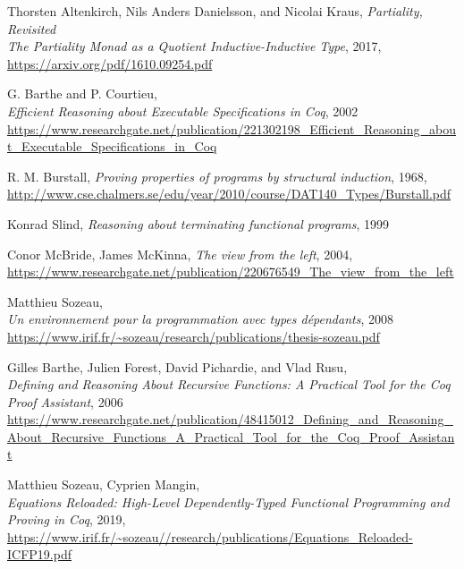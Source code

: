 \documentclass[declaration,mgr,english,shortabstract]{iithesis}
\begin{document}
\begin{thebibliography}{1}
    Thorsten Altenkirch, Nils Anders Danielsson, and Nicolai Kraus,
    \textit{Partiality, Revisited \\The Partiality Monad as a Quotient Inductive-Inductive Type},
    2017, \\
    \url{https://arxiv.org/pdf/1610.09254.pdf}

    G. Barthe and P. Courtieu, \\
    \textit{Efficient Reasoning about Executable Specifications in Coq},
    2002 \\
    \url{https://www.researchgate.net/publication/221302198_Efficient_Reasoning_about_Executable_Specifications_in_Coq}

    R. M. Burstall,
    \textit{Proving properties of programs by structural induction},
    1968, \\
    \url{http://www.cse.chalmers.se/edu/year/2010/course/DAT140_Types/Burstall.pdf}

    Konrad Slind,
    \textit{Reasoning about terminating functional programs},
    1999

    Conor McBride, James McKinna,
    \textit{The view from the left},
    2004, \\
    \url{https://www.researchgate.net/publication/220676549_The_view_from_the_left}

    Matthieu Sozeau, \\
    \textit{Un environnement pour la programmation avec types d\'{e}pendants},
    2008 \\
    \url{https://www.irif.fr/~sozeau/research/publications/thesis-sozeau.pdf}

    Gilles Barthe, Julien Forest, David Pichardie, and Vlad Rusu, \\
    \textit{Defining and Reasoning About Recursive Functions: A Practical Tool for the Coq Proof Assistant},
    2006 \\
    \url{https://www.researchgate.net/publication/48415012_Defining_and_Reasoning_About_Recursive_Functions_A_Practical_Tool_for_the_Coq_Proof_Assistant}

    Matthieu Sozeau, Cyprien Mangin, \\
    \textit{Equations Reloaded: High-Level Dependently-Typed Functional Programming and Proving in Coq},
    2019, \\
    \url{https://www.irif.fr/~sozeau//research/publications/Equations_Reloaded-ICFP19.pdf}


\end{thebibliography}
\end{document}
